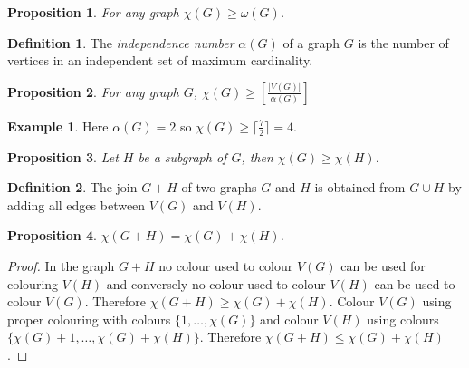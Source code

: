 \documentclass{article}
\newtheorem*{prop}{Proposition}
\theoremstyle{definition}
\newtheorem*{defn}{Definition}
\newtheorem*{ex}{Example}
\begin{document}
\begin{prop}
For any graph $\chi(G) \ge \omega(G)$.
\end{prop}

\begin{defn}
The \emph{independence number} $\alpha(G)$ of a graph $G$ is the number of vertices in an independent set of maximum cardinality.
\end{defn}

\begin{prop}
For any graph $G$, $\chi(G) \ge \left[ \frac{|V(G)|}{\alpha(G)}\right]$
\end{prop}

\begin{ex}
Here $\alpha(G) = 2$ so $\chi(G) \ge \lceil\frac{7}{2}\rceil = 4$.
\end{ex}

\begin{prop}
Let $H$ be a subgraph of $G$, then $\chi(G) \ge \chi(H)$.
\end{prop}

\begin{defn}
The join $G+H$ of two graphs $G$ and $H$ is obtained from $G\cup H$ by adding all edges between $V(G)$ and $V(H)$.
\end{defn}

\begin{prop}
$\chi(G+H) = \chi(G) + \chi(H)$.
\end{prop}

\begin{proof}
In the graph $G+H$ no colour used to colour $V(G)$ can be used for colouring $V(H)$ and conversely no colour used to colour $V(H)$ can be used to colour $V(G)$.
Therefore $\chi(G+H) \ge \chi(G) + \chi(H)$.
Colour $V(G)$ using proper colouring with colours $\{1,\ldots,\chi(G)\}$ and colour $V(H)$ using colours $\{\chi(G) + 1,\ldots, \chi(G) + \chi(H)\}$.
Therefore $\chi(G+H) \le \chi(G)  + \chi(H) $.
\end{proof}
\end{document}
